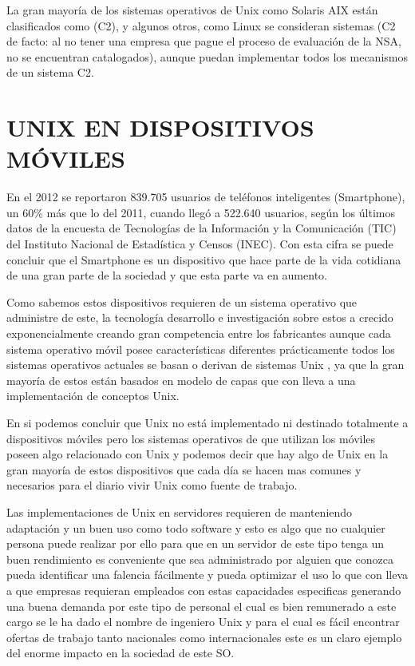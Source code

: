 La gran mayoría de los sistemas operativos de  Unix  como Solaris AIX están clasificados  como (C2), y algunos otros, como  Linux  se consideran sistemas  (C2 de facto: al  no 
tener  una empresa que pague el proceso de evaluación de la NSA, no se encuentran catalogados), aunque  puedan implementar todos  los mecanismos  de un sistema C2.


\section*{UNIX EN DISPOSITIVOS MÓVILES}
En el 2012 se reportaron 839.705 usuarios de teléfonos inteligentes (Smartphone), un 60\% más que lo del 2011, cuando llegó a 522.640 usuarios, según los últimos datos de la 
encuesta de Tecnologías de la Información y la Comunicación (TIC) del Instituto Nacional de Estadística y Censos (INEC).  Con esta cifra se puede concluir que el Smartphone es un 
dispositivo que hace parte de la vida cotidiana de una gran parte de la sociedad y que esta parte va en aumento.

Como sabemos estos dispositivos requieren de un sistema operativo que  administre de este, la tecnología desarrollo e investigación sobre estos a crecido exponencialmente creando 
gran competencia entre los fabricantes aunque cada sistema operativo móvil posee características diferentes prácticamente todos los sistemas operativos actuales se basan o 
derivan de sistemas Unix , ya que la gran mayoría de estos están basados en  modelo de capas que con lleva a una implementación de conceptos Unix.

En si podemos concluir que Unix no está implementado ni destinado totalmente a dispositivos móviles pero los sistemas operativos de que utilizan los móviles poseen algo 
relacionado con Unix y podemos decir que hay algo de Unix en la gran mayoría de estos dispositivos que cada día se hacen mas comunes y necesarios para el diario vivir
Unix como fuente de trabajo.

Las implementaciones de Unix en servidores requieren de manteniendo adaptación y un buen uso como todo software y esto es algo que no cualquier persona puede realizar por ello 
para que en un servidor de este tipo tenga un buen rendimiento es conveniente que sea administrado por alguien que conozca pueda identificar una falencia fácilmente y pueda 
optimizar el uso lo que con lleva a que empresas requieran  empleados con estas capacidades especificas generando una buena demanda por este tipo de personal el cual es bien 
remunerado a este cargo se le ha dado el nombre de ingeniero Unix y para el cual es fácil encontrar ofertas de trabajo tanto nacionales como internacionales este es un claro 
ejemplo del enorme impacto en la sociedad de este SO.





 